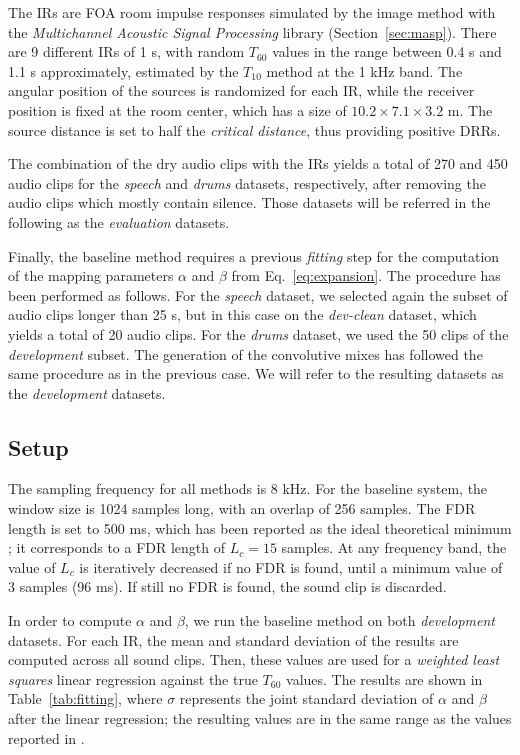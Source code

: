 The IRs are FOA room impulse responses simulated by the image method with the \textit{Multichannel Acoustic Signal Processing} library (Section~\ref{sec:masp}). There are 9 different IRs of 1 s, with random $T_{60}$ values in the range between 0.4 s and 1.1 s approximately, estimated by the $T_{10}$ method at the 1 kHz band. The angular position of the sources is randomized for each IR, while the receiver position is fixed at the room center, which has a size of $10.2 \times 7.1 \times 3.2$ m. The source distance is set to half the \textit{critical distance}, thus providing positive DRRs. 

The combination of the dry audio clips with the IRs yields a total of 270 and 450 audio clips for the \textit{speech} and \textit{drums} datasets, respectively, after removing the audio clips which mostly contain silence. Those datasets will be referred in the following as the \textit{evaluation} datasets. 

Finally, the baseline method requires a previous \textit{fitting} step for the computation of the mapping parameters $\alpha$ and $\beta$ from Eq.~\ref{eq:expansion}. The procedure has been performed as follows.
For the \textit{speech} dataset, we selected again the subset of audio clips longer than 25 s, but in this case on the \textit{dev-clean} dataset, which yields a total of 20 audio clips. 
For the \textit{drums} dataset, we used the 50 clips of the \textit{development} subset.
The generation of the convolutive mixes has followed the same procedure as in the previous case. We will refer to the resulting datasets as the \textit{development} datasets. 

\subsection{Setup}
\label{sec:setup}


The sampling frequency for all methods is 8 kHz.
For the baseline system, the window size is 1024 samples long, with an overlap of 256 samples. The FDR length is set to 500 ms, which has been reported as the ideal theoretical minimum \cite{prego2012blind}; it corresponds to a FDR length of $L_c = 15$ samples. 
At any frequency band, the value of $L_c$ is iteratively decreased if no FDR is found, until a minimum value of 3 samples (96 ms). If still no FDR is found, the sound clip is discarded. 

In order to compute $\alpha$ and $\beta$, we run the baseline method on both \textit{development} datasets. For each IR, the mean and standard deviation of the results are computed across all sound clips. Then, these values are used for a \textit{weighted least squares} linear regression against the true $T_{60}$ values.
The results are shown in Table~\ref{tab:fitting}, where $\sigma$ represents the joint standard deviation of $\alpha$ and $\beta$ after the linear regression; 
the resulting values are in the same range as the values reported in \cite{prego2012blind}. 



